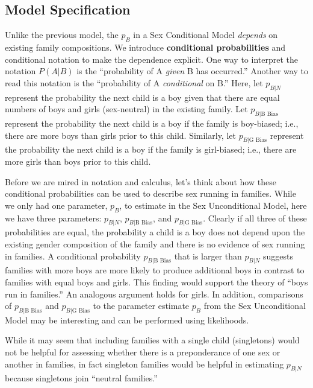 \documentclass[
]{krantz}
\newcommand{\neutral}{p_{B|N}}
\newcommand{\gbias}{p_{B|\textrm{G Bias}}}
\newcommand{\bbias}{p_{B|\textrm{B Bias}}}
\begin{document}
\hypertarget{model-specification}{%
\subsection{Model Specification}\label{model-specification}}

Unlike the previous model, the \(p_B\) in a Sex Conditional Model \emph{depends} on existing family compositions. We introduce \textbf{conditional probabilities} and conditional notation to make the dependence explicit. One way to interpret the notation \(P(A|B)\) is the ``probability of A \emph{given} B has occurred.'' Another way to read this notation is the ``probability of A \emph{conditional} on B.'' Here, let \(\neutral\) represent the probability the next child is a boy given that there are equal numbers of boys and girls (sex-neutral) in the existing family. Let \(\bbias\) represent the probability the next child is a boy if the family is boy-biased; i.e., there are more boys than girls prior to this child. Similarly, let \(\gbias\) represent the probability the next child is a boy if the family is girl-biased; i.e., there are more girls than boys prior to this child.

Before we are mired in notation and calculus, let's think about how these conditional probabilities can be used to describe sex running in families. While we only had one parameter, \(p_B\), to estimate in the Sex Unconditional Model, here we have three parameters: \(\neutral\), \(\bbias\), and \(\gbias\). Clearly if all three of these probabilities are equal, the probability a child is a boy does not depend upon the existing gender composition of the family and there is no evidence of sex running in families. A conditional probability \(\bbias\) that is larger than \(\neutral\) suggests families with more boys are more likely to produce additional boys in contrast to families with equal boys and girls. This finding would support the theory of ``boys run in families.'' An analogous argument holds for girls. In addition, comparisons of \(\bbias\) and \(\gbias\) to the parameter estimate \(p_B\) from the Sex Unconditional Model may be interesting and can be performed using likelihoods.

While it may seem that including families with a single child (singletons) would not be helpful for assessing whether there is a preponderance of one sex or another in families, in fact singleton families would be helpful in estimating \(\neutral\) because singletons join ``neutral families.''
\end{document}
